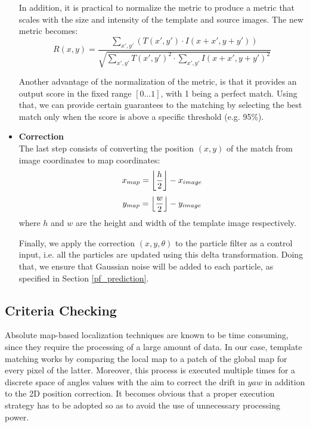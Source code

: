 \begin{itemize}
        In addition, it is practical to normalize the metric to produce a
        metric that scales with the size and intensity of the template
        and source images. The new metric becomes:
        \begin{equation}
            R(x, y) = \frac
            {\sum_{x', y'} (T(x', y') \cdot I(x + x', y + y'))}
            {\sqrt{
            \sum_{x', y'} T(x', y')^2 \cdot \sum_{x', y'} I(x + x', y + y')^2}}
        \end{equation}

        Another advantage of the normalization of the metric, is that it
        provides an output score in the fixed range $[0 \dots 1]$, with
        1 being a perfect match. Using that, we can provide certain guarantees
        to the matching by selecting the best match only when the score is
        above a specific threshold (e.g. 95\%).

    \item \textbf{Correction} \\
        The last step consists of converting the position $(x, y)$ of the match
        from image coordinates to map coordinates:
        \begin{equation}
            x_{map} = \floor*{\frac{h}{2}} - x_{image}
        \end{equation}
        \begin{equation}
            y_{map} = \floor*{\frac{w}{2}} - y_{image}
        \end{equation}
        where $h$ and $w$ are the height and width of the template image
        respectively.

        Finally, we apply the correction $(x, y, \theta)$ to the particle
        filter as a control input, i.e. all the particles are updated using
        this delta transformation. Doing that, we ensure that Gaussian
        noise will be added to each particle, as specified in Section
        \ref{pf_prediction}.
\end{itemize}

\subsection{Criteria Checking} \label{pose_correction_criteria}

Absolute map-based localization techniques are known to be time consuming,
since they require the processing of a large amount of data.
In our case, template matching works by comparing the local map
to a patch of the global map for every pixel of the latter.
Moreover, this process is executed multiple times for a discrete space
of angles values with the aim to correct the drift in $yaw$ in addition to
the 2D position correction.
It becomes obvious that a proper execution strategy has to be
adopted so as to avoid the use of unnecessary processing power.

